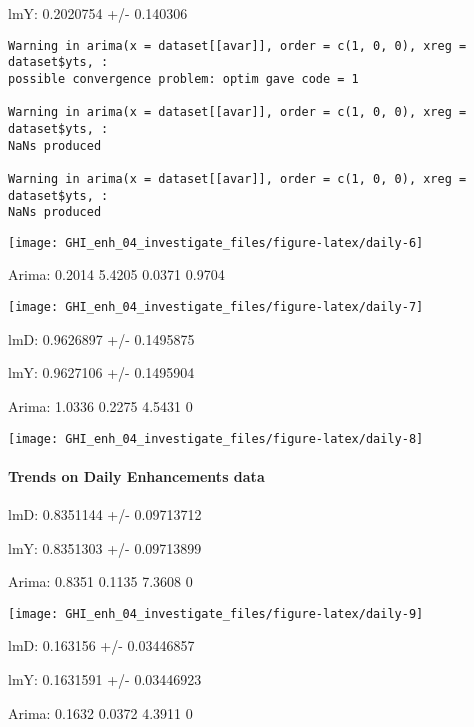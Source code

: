 \documentclass[
  10pt,
  a4paper,oneside]{article}
\begin{document}
lmY: 0.2020754 +/- 0.140306

\begin{verbatim}
Warning in arima(x = dataset[[avar]], order = c(1, 0, 0), xreg = dataset$yts, :
possible convergence problem: optim gave code = 1

Warning in arima(x = dataset[[avar]], order = c(1, 0, 0), xreg = dataset$yts, :
NaNs produced

Warning in arima(x = dataset[[avar]], order = c(1, 0, 0), xreg = dataset$yts, :
NaNs produced
\end{verbatim}

\begin{center}\texttt{[image: GHI\_enh\_04\_investigate\_files/figure-latex/daily-6]} \end{center}

Arima: 0.2014 5.4205 0.0371 0.9704

\begin{center}\texttt{[image: GHI\_enh\_04\_investigate\_files/figure-latex/daily-7]} \end{center}

lmD: 0.9626897 +/- 0.1495875

lmY: 0.9627106 +/- 0.1495904

Arima: 1.0336 0.2275 4.5431 0

\begin{center}\texttt{[image: GHI\_enh\_04\_investigate\_files/figure-latex/daily-8]} \end{center}

\newpage

\hypertarget{trends-on-daily-enhancements-data}{%
\paragraph{Trends on Daily Enhancements data}\label{trends-on-daily-enhancements-data}}

lmD: 0.8351144 +/- 0.09713712

lmY: 0.8351303 +/- 0.09713899

Arima: 0.8351 0.1135 7.3608 0

\begin{center}\texttt{[image: GHI\_enh\_04\_investigate\_files/figure-latex/daily-9]} \end{center}

lmD: 0.163156 +/- 0.03446857

lmY: 0.1631591 +/- 0.03446923

Arima: 0.1632 0.0372 4.3911 0
\end{document}
